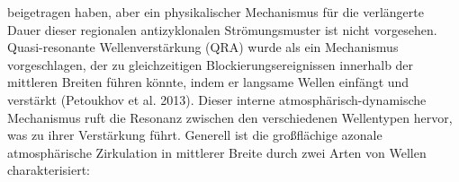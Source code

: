 beigetragen haben, aber ein physikalischer Mechanismus für die verlängerte Dauer dieser regionalen antizyklonalen Strömungsmuster ist nicht vorgesehen. Quasi-resonante Wellenverstärkung (QRA) wurde als ein Mechanismus vorgeschlagen, der zu gleichzeitigen Blockierungsereignissen innerhalb der mittleren Breiten führen könnte, indem er langsame Wellen einfängt und verstärkt (Petoukhov et al. 2013). Dieser interne atmosphärisch-dynamische Mechanismus ruft die Resonanz zwischen den verschiedenen Wellentypen hervor, was zu ihrer Verstärkung führt. Generell ist die großflächige azonale atmosphärische Zirkulation in mittlerer Breite durch zwei Arten von Wellen charakterisiert:  
